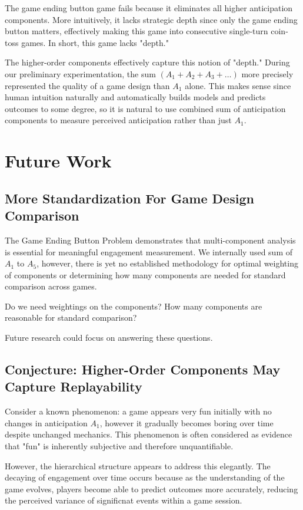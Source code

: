 \documentclass{article}
\begin{document}
The game ending button game fails because it eliminates all higher anticipation components. More intuitively, it lacks strategic depth since only the game ending button matters, effectively making this game into consecutive single-turn coin-toss games. In short, this game lacks "depth."

The higher-order components effectively capture this notion of "depth." During our preliminary experimentation, the sum $(A_1 + A_2 + A_3 + \ldots)$ more precisely represented the quality of a game design than $A_1$ alone. This makes sense since human intuition naturally and automatically builds models and predicts outcomes to some degree, so it is natural to use combined sum of anticipation components to measure perceived anticipation rather than just $A_1$.

\section{Future Work}

\subsection{More Standardization For Game Design Comparison}

The Game Ending Button Problem demonstrates that multi-component analysis is essential for meaningful engagement measurement. We internally used sum of $A_1$ to $A_5$, however, there is yet no established methodology for optimal weighting of components or determining how many components are needed for standard comparison across games.

Do we need weightings on the components? How many components are reasonable for standard comparison?

Future research could focus on answering these questions.

\subsection{Conjecture: Higher-Order Components May Capture Replayability}

Consider a known phenomenon: a game appears very fun initially with no changes in anticipation $A_1$, however it gradually becomes boring over time despite unchanged mechanics. This phenomenon is often considered as evidence that "fun" is inherently subjective and therefore unquantifiable.

However, the hierarchical structure appears to address this elegantly. The decaying of engagement over time occurs because as the understanding of the game evolves, players become able to predict outcomes more accurately, reducing the perceived variance of significnat events within a game session.
\end{document}
